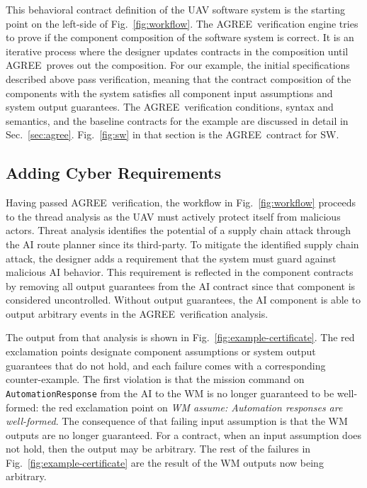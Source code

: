 \documentclass[global,twocolumn]{svjour}
\newcommand{\figref}[1]{Fig.~\ref{#1}}
\newcommand{\secref}[1]{Sec.~\ref{#1}}
\newcommand{\agr}{AGREE}
\begin{document}
This behavioral contract definition of the UAV software system is the starting point on the left-side of \figref{fig:workflow}.
%
The \agr\ verification engine tries to prove if the component composition of the software system is correct.
%
It is an iterative process where the designer updates contracts in the composition until \agr\ proves out the composition.
%
For our example, the initial specifications described above pass verification, meaning that the contract composition of the components with the system satisfies all component input assumptions and system output guarantees.
%
The \agr\ verification conditions, syntax and semantics, and the baseline contracts for the example are discussed in detail in \secref{sec:agree}.
%
\figref{fig:sw} in that section is the \agr\ contract for SW.


\subsection{Adding Cyber Requirements}

Having passed \agr\ verification, the workflow in \figref{fig:workflow} proceeds to the thread analysis as the UAV must actively protect itself from malicious actors.
%
Threat analysis identifies the potential of a supply chain attack through the AI route planner since its third-party.
%
To mitigate the identified supply chain attack, the designer adds a requirement that the system must guard against malicious AI behavior.
%
This requirement is reflected in the component contracts by removing all output guarantees from the AI contract since that component is considered uncontrolled.
%
Without output guarantees, the AI component is able to output arbitrary events in the \agr\ verification analysis.

The output from that analysis is shown in \figref{fig:example-certificate}.
%
The red exclamation points designate component assumptions or system output guarantees that do not hold, and each failure comes with a corresponding counter-example.
%
The first violation is that the mission command on \texttt{AutomationResponse} from the AI to the WM is no longer guaranteed to be well-formed: the red exclamation point on \emph{WM assume: Automation responses are well-formed}.
%
The consequence of that failing input assumption is that the WM outputs are no longer guaranteed.
%
For a contract, when an input assumption does not hold, then the output may be arbitrary.
%
The rest of the failures in \figref{fig:example-certificate} are the result of the WM outputs now being arbitrary.
\end{document}
